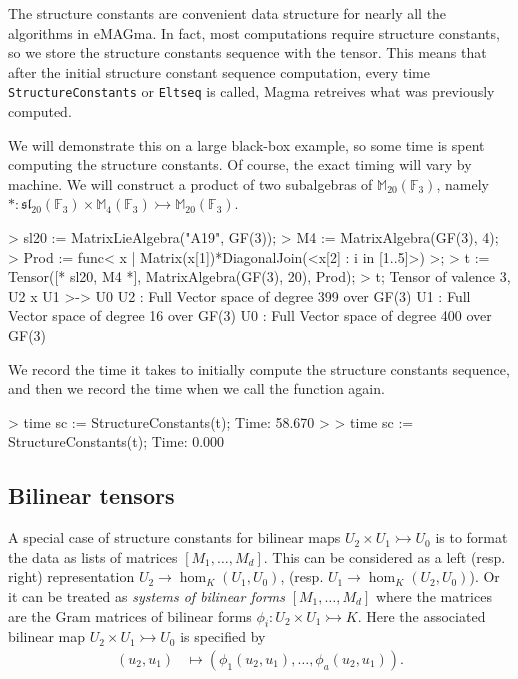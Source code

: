 \begin{example}[SCStored]

The structure constants are convenient data structure for nearly all the algorithms in eMAGma. 
In fact, most computations require structure constants, so we store the structure constants sequence with the tensor. 
This means that after the initial structure constant sequence computation, every time \texttt{StructureConstants} or \texttt{Eltseq} is called, Magma retreives what was previously computed. 

We will demonstrate this on a large black-box example, so some time is spent computing the structure constants. 
Of course, the exact timing will vary by machine.
We will construct a product of two subalgebras of $\mathbb{M}_{20}(\mathbb{F}_3)$, namely $* : \mathfrak{sl}_{20}(\mathbb{F}_3)\times \mathbb{M}_4(\mathbb{F}_3)\rightarrowtail \mathbb{M}_{20}(\mathbb{F}_3)$.

\begin{code}
> sl20 := MatrixLieAlgebra("A19", GF(3));
> M4 := MatrixAlgebra(GF(3), 4);
> Prod := func< x | Matrix(x[1])*DiagonalJoin(<x[2] : i in [1..5]>) >;
> t := Tensor([* sl20, M4 *], MatrixAlgebra(GF(3), 20), Prod);
> t;
Tensor of valence 3, U2 x U1 >-> U0
U2 : Full Vector space of degree 399 over GF(3)
U1 : Full Vector space of degree 16 over GF(3)
U0 : Full Vector space of degree 400 over GF(3)
\end{code}

We record the time it takes to initially compute the structure constants sequence, and then we record the time when we call the function again.
\begin{code}
> time sc := StructureConstants(t);
Time: 58.670
> 
> time sc := StructureConstants(t);
Time: 0.000
\end{code}
\end{example}





\subsection{Bilinear tensors}
A special case of structure constants for bilinear maps $U_2\times U_1\rightarrowtail U_0$
is to format the data as lists of matrices $[M_1,\dots, M_d]$.
This can be considered as a left (resp. right) representation
$U_2\to \hom_K(U_1,U_0)$, (resp. $U_1\to \hom_K(U_2,U_0)$).  
Or it can be treated as {\em systems of bilinear forms} 
$[M_1,\dots,M_d]$ where the matrices are the Gram matrices of bilinear forms $\phi_i:U_2\times U_1\rightarrowtail K$.
Here the associated bilinear map $U_2\times U_1\rightarrowtail U_0$ is 
specified by
\begin{align*}
	(u_2,u_1) & \mapsto ( \phi_1(u_2,u_1),\dots, \phi_a(u_2,u_1)).
\end{align*}

